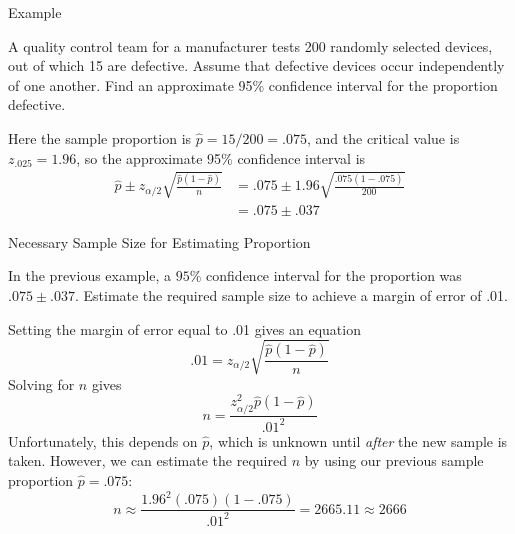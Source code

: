 \documentclass[handout]{beamer}
\begin{document}
\begin{frame}{Example}
\begin{block}{}
A quality control team for a manufacturer tests 200 randomly selected devices, out of which 15 are defective. Assume that defective devices occur independently of one another. Find an approximate 95\% confidence interval for the proportion defective.
\end{block}
\pause Here the sample proportion is $\hat p=15/200=.075$, and the critical value is $z_{.025}=1.96$, so the approximate 95\% confidence interval is
\begin{align*}
\hat p \pm z_{\alpha/2}\sqrt{\frac{\hat p(1-\hat p)}n} &= .075 \pm 1.96\sqrt{\frac{.075(1-.075)}{200}} \\
&= .075 \pm .037
\end{align*}
\end{frame}

\begin{frame}{Necessary Sample Size for Estimating Proportion}
\begin{block}{}
In the previous example, a $95\%$ confidence interval for the proportion was $.075 \pm .037$. Estimate the required sample size to achieve a margin of error of .01.
\end{block}
\pause Setting the margin of error equal to .01 gives an equation
$$.01=z_{\alpha/2}\sqrt{\frac{\hat p(1-\hat p)}n}$$
\pause Solving for $n$ gives
$$n=\frac{z_{\alpha/2}^2\hat p(1-\hat p)}{.01^2}$$
\pause Unfortunately, this depends on $\hat p$, which is unknown until \textit{after} the new sample is taken. \pause However, we can estimate the required $n$ by using our previous sample proportion $\hat p = .075$:
\pause
$$n \approx \frac{1.96^2(.075)(1-.075)}{.01^2}=2665.11 \approx 2666$$
\end{frame}
\end{document}
